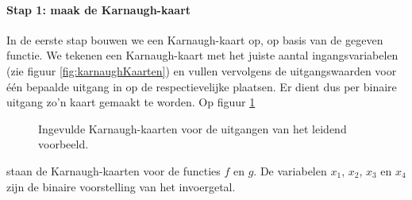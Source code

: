 \paragraph{Stap 1: maak de Karnaugh-kaart}
In de eerste stap bouwen we een Karnaugh-kaart op, op basis van de gegeven functie. We tekenen een Karnaugh-kaart met het juiste aantal ingangsvariabelen (zie figuur \ref{fig:karnaughKaarten}) en vullen vervolgens de uitgangswaarden voor \'e\'en bepaalde uitgang in op de respectievelijke plaatsen. Er dient dus per binaire uitgang zo'n kaart gemaakt te worden. Op figuur \ref{fig:karnaughKaartenVoorbeeldGetekend}
\begin{figure}[hbt]
\centering
{}
\caption{Ingevulde Karnaugh-kaarten voor de uitgangen van het leidend voorbeeld.}
\label{fig:karnaughKaartenVoorbeeldGetekend}
\end{figure}
staan de Karnaugh-kaarten voor de functies $f$ en $g$. De variabelen $x_1$, $x_2$, $x_3$ en $x_4$ zijn de binaire voorstelling van het invoergetal.
